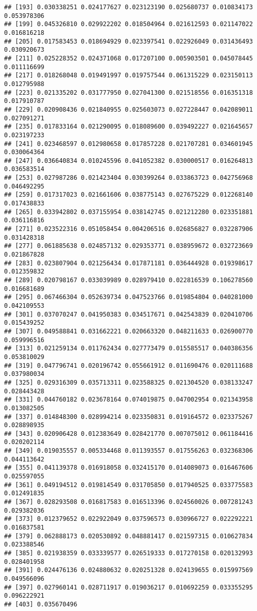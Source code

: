 \documentclass[
]{article}
\begin{document}
\begin{verbatim}
## [193] 0.030338251 0.024177627 0.023123190 0.025680737 0.010834173 0.053978306
## [199] 0.045326810 0.029922202 0.018504964 0.021612593 0.021147022 0.016816218
## [205] 0.017583453 0.018694929 0.023397541 0.022926049 0.031436493 0.030920673
## [211] 0.025228352 0.024371068 0.017207100 0.005903501 0.045078445 0.011116699
## [217] 0.018268048 0.019491997 0.019757544 0.061315229 0.023150113 0.012795988
## [223] 0.021335202 0.031777950 0.027041300 0.021518556 0.016351318 0.017910787
## [229] 0.020908436 0.021840955 0.025603073 0.027228447 0.042089011 0.027091271
## [235] 0.017833164 0.021290095 0.018089600 0.039492227 0.021645657 0.023197233
## [241] 0.023468597 0.012980658 0.017857228 0.021707281 0.034601945 0.030064364
## [247] 0.036640834 0.010245596 0.041052382 0.030000517 0.016264813 0.036583514
## [253] 0.027987286 0.021423404 0.030399264 0.033863723 0.042756968 0.046492295
## [259] 0.017317023 0.021661606 0.038775143 0.027675229 0.012268140 0.017438833
## [265] 0.033942802 0.037155954 0.038142745 0.021212280 0.023351881 0.036116816
## [271] 0.023522316 0.051058454 0.004206516 0.026856827 0.032287906 0.031428318
## [277] 0.061885638 0.024857132 0.029353771 0.038959672 0.032723669 0.021867828
## [283] 0.023807904 0.021256434 0.017871181 0.036444928 0.019398617 0.012359832
## [289] 0.020798167 0.033039989 0.028979410 0.022816539 0.106278560 0.016681689
## [295] 0.067466304 0.052639734 0.047523766 0.019854804 0.040281000 0.042109553
## [301] 0.037070247 0.041950383 0.034517671 0.042543839 0.020410706 0.015439252
## [307] 0.049588841 0.031662221 0.020663320 0.048211633 0.026900770 0.059996516
## [313] 0.021259134 0.011762434 0.027773479 0.015585517 0.040386356 0.053810029
## [319] 0.047796741 0.020196742 0.055661912 0.011690476 0.020111688 0.037980034
## [325] 0.029316309 0.035713311 0.023588325 0.021304520 0.038133247 0.028443428
## [331] 0.044760182 0.023678164 0.074019875 0.047002954 0.021343958 0.013082505
## [337] 0.014848300 0.028994214 0.023350831 0.019164572 0.023375267 0.028898935
## [343] 0.020906428 0.012383649 0.028421770 0.007075012 0.061184416 0.020202114
## [349] 0.019035557 0.005334468 0.011393557 0.017556263 0.032368306 0.044113642
## [355] 0.041139378 0.016918058 0.032415170 0.014089073 0.016467606 0.025597055
## [361] 0.049194512 0.019814549 0.031705850 0.017940525 0.033775583 0.012491835
## [367] 0.028293508 0.016817583 0.016513396 0.024560026 0.007281243 0.029382036
## [373] 0.012379652 0.022922049 0.037596573 0.030966727 0.022292221 0.016837581
## [379] 0.062888173 0.020530892 0.048881417 0.021597315 0.010627834 0.023388546
## [385] 0.021938359 0.033339577 0.026519333 0.017270158 0.020132993 0.028401958
## [391] 0.024476136 0.024880632 0.020251328 0.024139655 0.015997569 0.049566096
## [397] 0.027960141 0.028711917 0.019036217 0.010692259 0.033355295 0.096222921
## [403] 0.035670496
\end{verbatim}
\end{document}
